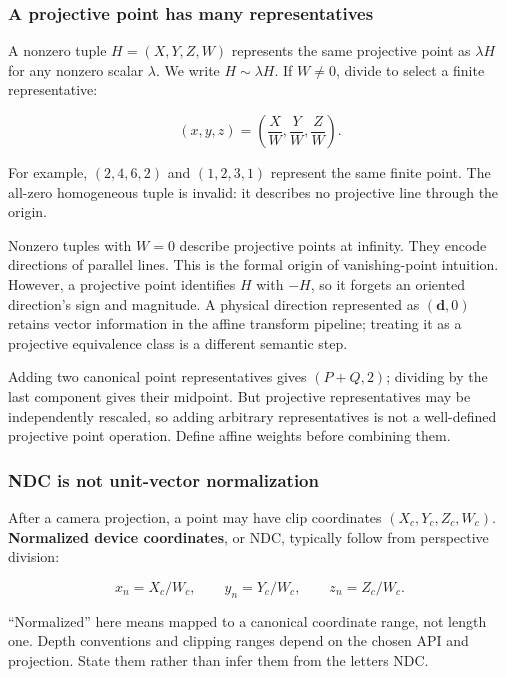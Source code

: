 \subsubsection{A projective point has many representatives}\label{01-foundations-i-ch018-a-projective-point-has-many-representatives}

A nonzero tuple \(H=(X,Y,Z,W)\) represents the same projective point as \(\lambda H\) for any nonzero scalar \(\lambda\). We write \(H\sim\lambda H\). If \(W\ne0\), divide to select a finite representative:

\[
(x,y,z)=\left(\frac XW,\frac YW,\frac ZW\right).
\]

For example, \((2,4,6,2)\) and \((1,2,3,1)\) represent the same finite point. The all-zero homogeneous tuple is invalid: it describes no projective line through the origin.

Nonzero tuples with \(W=0\) describe projective points at infinity. They encode directions of parallel lines. This is the formal origin of vanishing-point intuition. However, a projective point identifies \(H\) with \(-H\), so it forgets an oriented direction's sign and magnitude. A physical direction represented as \((\mathbf d,0)\) retains vector information in the affine transform pipeline; treating it as a projective equivalence class is a different semantic step.

Adding two canonical point representatives gives \((P+Q,2)\); dividing by the last component gives their midpoint. But projective representatives may be independently rescaled, so adding arbitrary representatives is not a well-defined projective point operation. Define affine weights before combining them.

\subsubsection{NDC is not unit-vector normalization}\label{01-foundations-i-ch018-ndc-is-not-unit-vector-normalization}

After a camera projection, a point may have clip coordinates \((X_c,Y_c,Z_c,W_c)\). \textbf{Normalized device coordinates}, or NDC, typically follow from perspective division:

\[
x_n=X_c/W_c,\qquad y_n=Y_c/W_c,\qquad z_n=Z_c/W_c.
\]

``Normalized'' here means mapped to a canonical coordinate range, not length one. Depth conventions and clipping ranges depend on the chosen API and projection. State them rather than infer them from the letters NDC.

